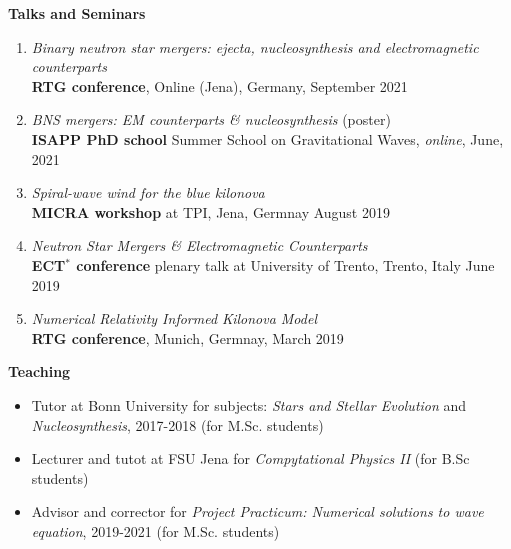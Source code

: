 \documentclass[
openright,
12pt, %
english,%
onehalfspacing, %
nolistspacing, %
nohyperref, %
headsepline, %
]{MastersDoctoralThesis} %
\begin{document}
\newpage

\noindent \textbf{Talks and Seminars}

\begin{enumerate}
    \item \textit{Binary neutron star mergers: ejecta, nucleosynthesis and electromagnetic counterparts} \\
    \textbf{RTG conference}, Online (Jena), Germany, September 2021
    \item \textit{BNS mergers: EM counterparts \& nucleosynthesis} (poster) \\
    \textbf{ISAPP PhD school} Summer School on Gravitational Waves, \textit{online}, June, 2021 
    \item \textit{Spiral-wave wind for the blue kilonova} \\
    \textbf{MICRA workshop} at TPI, Jena, Germnay August 2019 
    \item \textit{Neutron Star Mergers \& Electromagnetic Counterparts} \\
    \textbf{ECT$^*$ conference} plenary talk at University of Trento, Trento, Italy June 2019 
    \item \textit{Numerical Relativity Informed Kilonova Model} \\
    \textbf{RTG conference}, Munich, Germnay, March 2019
\end{enumerate}

\noindent \textbf{Teaching}

\begin{itemize}
    \item Tutor at Bonn University for subjects: 
    \textit{Stars and Stellar Evolution} and \textit{Nucleosynthesis}, 2017-2018 (for M.Sc. students)
    \item Lecturer and tutot at FSU Jena for \textit{Compytational Physics II} (for B.Sc students)
    \item Advisor and corrector for \textit{Project Practicum: Numerical solutions to wave equation}, 2019-2021 
    (for M.Sc. students)
\end{itemize}

\end{document}

